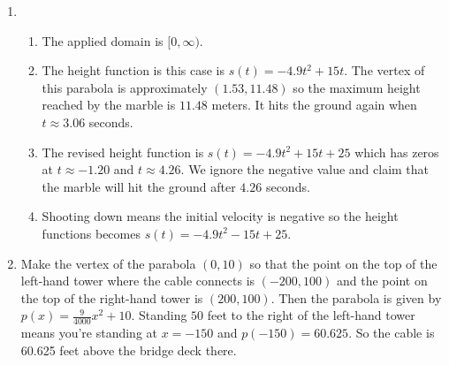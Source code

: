 \begin{enumerate}
\setcounter{enumi}{\value{HW}}


\item \begin{enumerate}

\item The applied domain is $[0, \infty)$.

\addtocounter{enumii}{2}

\item The height function is this case is $s(t) = -4.9t^{2} + 15t$.  The vertex of this parabola is approximately $(1.53, 11.48)$ so the maximum height reached by the marble is $11.48$ meters.  It hits the ground again when $t \approx 3.06$ seconds.

\item The revised height function is $s(t) = -4.9t^{2} + 15t + 25$ which has zeros at $t \approx -1.20$ and $t \approx 4.26$.  We ignore the negative value and claim that the marble will hit the ground after $4.26$ seconds.

\item Shooting down means the initial velocity is negative so the height functions becomes $s(t) = -4.9t^{2} - 15t + 25$.

\end{enumerate}

\item Make the vertex of the parabola $(0, 10)$ so that the point on the top of the left-hand tower where the cable connects is $(-200, 100)$ and the point on the top of the right-hand tower is $(200, 100)$.  Then the parabola is given by $p(x) = \frac{9}{4000}x^{2} + 10$.  Standing $50$ feet to the right of the left-hand tower means you're standing at $x= -150$ and $p(-150) = 60.625$.  So the cable is 60.625 feet above the bridge deck there.


\setcounter{HW}{\value{enumi}}
\end{enumerate}

